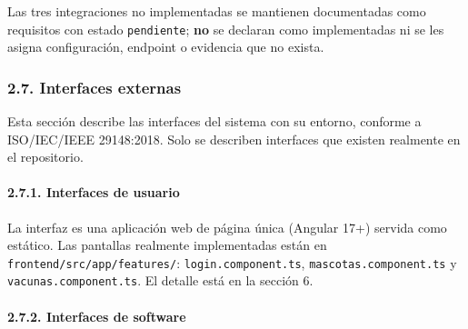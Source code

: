 \documentclass[
  spanish,
]{article}
\begin{document}
Las tres integraciones no implementadas se mantienen documentadas como
requisitos con estado \texttt{pendiente}; \textbf{no} se declaran como
implementadas ni se les asigna configuración, endpoint o evidencia que
no exista.

\subsubsection{2.7. Interfaces externas}\label{interfaces-externas}

Esta sección describe las interfaces del sistema con su entorno,
conforme a ISO/IEC/IEEE 29148:2018. Solo se describen interfaces que
existen realmente en el repositorio.

\paragraph{2.7.1. Interfaces de usuario}\label{interfaces-de-usuario}

La interfaz es una aplicación web de página única (Angular 17+) servida
como estático. Las pantallas realmente implementadas están en
\texttt{frontend/\allowbreak{}src/\allowbreak{}app/\allowbreak{}features/}: \texttt{login.\allowbreak{}component.\allowbreak{}ts},
\texttt{mascotas.\allowbreak{}component.\allowbreak{}ts} y \texttt{vacunas.\allowbreak{}component.\allowbreak{}ts}. El
detalle está en la sección 6.

\paragraph{2.7.2. Interfaces de software}\label{interfaces-de-software}
\end{document}
